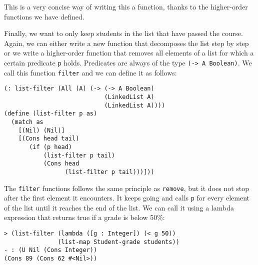 \documentclass{article}
\begin{document}
This is a very concise way of writing this a function, thanks to the higher-order functions we have defined.

Finally, we want to only keep students in the list that have passed the course. Again, we can either write a new function that decomposes the list step by step or we write a higher-order function that removes all elements of a list for which a certain predicate \lstinline{p} holds. Predicates are always of the type \lstinline{(-> A Boolean)}. We call this function \lstinline{filter} and we can define it as follows:

\begin{lstlisting}
(: list-filter (All (A) (-> (-> A Boolean)
                            (LinkedList A)
                            (LinkedList A))))
(define (list-filter p as)
  (match as
    [(Nil) (Nil)]
    [(Cons head tail)
       (if (p head)
           (list-filter p tail)
           (Cons head
                 (list-filter p tail)))]))
\end{lstlisting}

The \lstinline{filter} functions follows the same principle as \lstinline{remove}, but it does not stop after the first element it encounters. It keeps going and calls \lstinline{p} for every element of the list until it reaches the end of the list. We can call it using a lambda expression that returns true if a grade is below 50\%:

\begin{lstlisting}
> (list-filter (lambda ([g : Integer]) (< g 50))
               (list-map Student-grade students))
- : (U Nil (Cons Integer))
(Cons 89 (Cons 62 #<Nil>))
\end{lstlisting}
\end{document}
